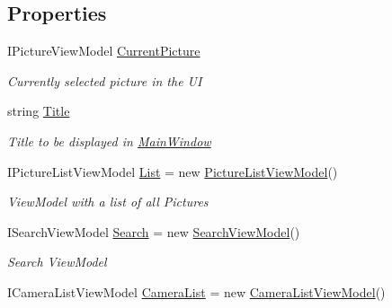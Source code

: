 \subsection*{Properties}
\begin{DoxyCompactItemize}
\item 
I\+Picture\+View\+Model \mbox{\hyperlink{class_pic_d_b_1_1_models_1_1_main_window_view_model_a2b686555cae56d5875e2faf772847751}{Current\+Picture}}
\begin{DoxyCompactList}\small\item\em Currently selected picture in the UI \end{DoxyCompactList}\item 
string \mbox{\hyperlink{class_pic_d_b_1_1_models_1_1_main_window_view_model_a4c06e423175530049a3b2df513a35786}{Title}}
\begin{DoxyCompactList}\small\item\em Title to be displayed in \mbox{\hyperlink{class_pic_d_b_1_1_main_window}{Main\+Window}} \end{DoxyCompactList}\item 
I\+Picture\+List\+View\+Model \mbox{\hyperlink{class_pic_d_b_1_1_models_1_1_main_window_view_model_a57378f3723a213bfaa62c82363b65138}{List}} = new \mbox{\hyperlink{class_pic_d_b_1_1_view_models_1_1_picture_list_view_model}{Picture\+List\+View\+Model}}()
\begin{DoxyCompactList}\small\item\em View\+Model with a list of all Pictures \end{DoxyCompactList}\item 
I\+Search\+View\+Model \mbox{\hyperlink{class_pic_d_b_1_1_models_1_1_main_window_view_model_ac59235f79afc4e764b72fffd719fa9fd}{Search}} = new \mbox{\hyperlink{class_pic_d_b_1_1_models_1_1_search_view_model}{Search\+View\+Model}}()
\begin{DoxyCompactList}\small\item\em Search View\+Model \end{DoxyCompactList}\item 
I\+Camera\+List\+View\+Model \mbox{\hyperlink{class_pic_d_b_1_1_models_1_1_main_window_view_model_a25e33fd3ffcf5e5486a81dbcdd2e6c33}{Camera\+List}} = new \mbox{\hyperlink{class_pic_d_b_1_1_view_models_1_1_camera_list_view_model}{Camera\+List\+View\+Model}}()

\end{DoxyCompactItemize}
